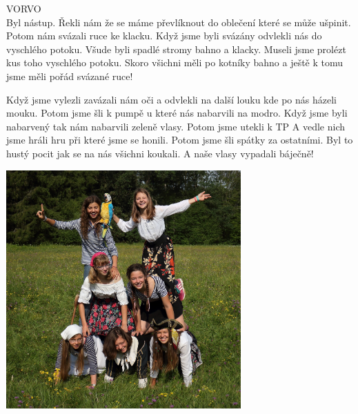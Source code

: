 \begin{multicols}{1}

VORVO\\
Byl nástup. Řekli nám že se máme převlíknout do oblečení které se může ušpinit. Potom nám svázali ruce ke klacku. Když jsme byli svázány odvlekli nás do vyschlého potoku. Všude byli spadlé stromy bahno a klacky. Museli jsme prolézt kus toho vyschlého potoku. Skoro všichni měli po kotníky bahno a ještě k tomu jsme měli pořád svázané ruce! 


Když jsme vylezli zavázali nám oči a odvlekli na další louku kde po nás házeli mouku. Potom jsme šli k pumpě u které nás nabarvili na modro. Když jsme byli nabarvený tak nám nabarvili zeleně vlasy. Potom jsme utekli k TP A vedle nich jsme hráli hru při které jsme se honili. Potom jsme šli spátky za ostatními. Byl to hustý pocit jak se na nás všichni koukali. A naše vlasy vypadali báječně!


\end{multicols}

\begin{center}

\includegraphics[width=9cm]{img/druziny/boruwky.jpg}

\end{center}

\clearpage


